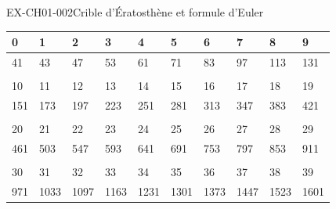 \begin{exercice}{EX-CH01-002}{Crible d'Ératosthène et formule d'Euler}
\vspace{20pt}
\def\arraystretch{1.5}
\begin{tabularx}{\linewidth}{|*{10}{>{\centering\arraybackslash}X|}}
\hline
\cellcolor{vlmgray} 0 &\cellcolor{vlmgray} 1 &\cellcolor{vlmgray} 2 &\cellcolor{vlmgray} 3 &\cellcolor{vlmgray} 4 &\cellcolor{vlmgray} 5 &\cellcolor{vlmgray} 6 &\cellcolor{vlmgray} 7 &\cellcolor{vlmgray} 8 &\cellcolor{vlmgray}9 \\
\hline
\textcolor{\colSolution}{41} & \textcolor{\colSolution}{43} & \textcolor{\colSolution}{47} & \textcolor{\colSolution}{53} & \textcolor{\colSolution}{61} & \textcolor{\colSolution}{71} & \textcolor{\colSolution}{83} & \textcolor{\colSolution}{97} & \textcolor{\colSolution}{113} & \textcolor{\colSolution}{131} \\
\hline
\multicolumn{10}{X}{}\\
\hline
\cellcolor{vlmgray} 10 &\cellcolor{vlmgray} 11 &\cellcolor{vlmgray} 12 &\cellcolor{vlmgray} 13 &\cellcolor{vlmgray} 14 &\cellcolor{vlmgray} 15 &\cellcolor{vlmgray} 16 &\cellcolor{vlmgray} 17 &\cellcolor{vlmgray} 18 &\cellcolor{vlmgray}19 \\
\hline
\textcolor{\colSolution}{151} & \textcolor{\colSolution}{173} & \textcolor{\colSolution}{197} & \textcolor{\colSolution}{223} & \textcolor{\colSolution}{251} & \textcolor{\colSolution}{281} & \textcolor{\colSolution}{313} & \textcolor{\colSolution}{347} & \textcolor{\colSolution}{383} & \textcolor{\colSolution}{421} \\
\hline
\multicolumn{10}{X}{}\\
\hline
\cellcolor{vlmgray} 20 &\cellcolor{vlmgray} 21 &\cellcolor{vlmgray} 22 &\cellcolor{vlmgray} 23 &\cellcolor{vlmgray} 24 &\cellcolor{vlmgray} 25 &\cellcolor{vlmgray} 26 &\cellcolor{vlmgray} 27 &\cellcolor{vlmgray} 28 &\cellcolor{vlmgray}29 \\
\hline
\textcolor{\colSolution}{461} & \textcolor{\colSolution}{503} & \textcolor{\colSolution}{547} & \textcolor{\colSolution}{593} & \textcolor{\colSolution}{641} & \textcolor{\colSolution}{691} & \textcolor{\colSolution}{753} & \textcolor{\colSolution}{797} & \textcolor{\colSolution}{853} & \textcolor{\colSolution}{911} \\
\hline
\multicolumn{10}{X}{}\\
\hline
\cellcolor{vlmgray} 30 &\cellcolor{vlmgray} 31 &\cellcolor{vlmgray} 32 &\cellcolor{vlmgray} 33 &\cellcolor{vlmgray} 34 &\cellcolor{vlmgray} 35 &\cellcolor{vlmgray} 36 &\cellcolor{vlmgray} 37 &\cellcolor{vlmgray} 38 &\cellcolor{vlmgray}39 \\
\hline
\textcolor{\colSolution}{971} & \textcolor{\colSolution}{1033} & \textcolor{\colSolution}{1097} & \textcolor{\colSolution}{1163} & \textcolor{\colSolution}{1231} & \textcolor{\colSolution}{1301} & \textcolor{\colSolution}{1373} & \textcolor{\colSolution}{1447} & \textcolor{\colSolution}{1523} & \textcolor{\colSolution}{1601} \\
\hline
\end{tabularx}\def\arraystretch{1}

\end{exercice}